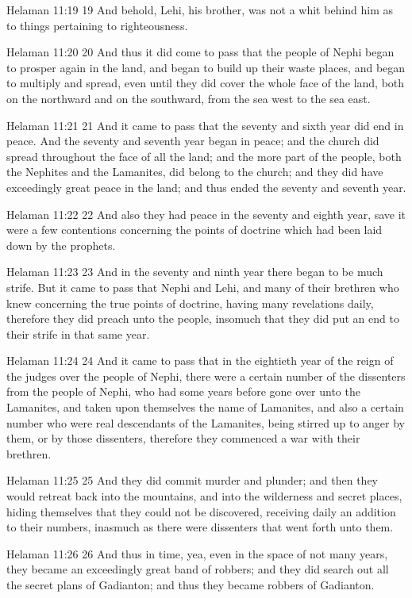 Helaman 11:19
 19 And behold, Lehi, his brother, was not a whit behind him as
to things pertaining to righteousness.

Helaman 11:20
 20 And thus it did come to pass that the people of Nephi began
to prosper again in the land, and began to build up their waste
places, and began to multiply and spread, even until they did
cover the whole face of the land, both on the northward and on
the southward, from the sea west to the sea east.

Helaman 11:21
 21 And it came to pass that the seventy and sixth year did end
in peace. And the seventy and seventh year began in peace; and
the church did spread throughout the face of all the land; and
the more part of the people, both the Nephites and the Lamanites,
did belong to the church; and they did have exceedingly great
peace in the land; and thus ended the seventy and seventh year.

Helaman 11:22
 22 And also they had peace in the seventy and eighth year, save
it were a few contentions concerning the points of doctrine which
had been laid down by the prophets.

Helaman 11:23
 23 And in the seventy and ninth year there began to be much
strife. But it came to pass that Nephi and Lehi, and many of
their brethren who knew concerning the true points of doctrine,
having many revelations daily, therefore they did preach unto the
people, insomuch that they did put an end to their strife in that
same year.

Helaman 11:24
 24 And it came to pass that in the eightieth year of the reign
of the judges over the people of Nephi, there were a certain
number of the dissenters from the people of Nephi, who had some
years before gone over unto the Lamanites, and taken upon
themselves the name of Lamanites, and also a certain number who
were real descendants of the Lamanites, being stirred up to anger
by them, or by those dissenters, therefore they commenced a war
with their brethren.

Helaman 11:25
 25 And they did commit murder and plunder; and then they would
retreat back into the mountains, and into the wilderness and
secret places, hiding themselves that they could not be
discovered, receiving daily an addition to their numbers,
inasmuch as there were dissenters that went forth unto them.

Helaman 11:26
 26 And thus in time, yea, even in the space of not many years,
they became an exceedingly great band of robbers; and they did
search out all the secret plans of Gadianton; and thus they
became robbers of Gadianton.

